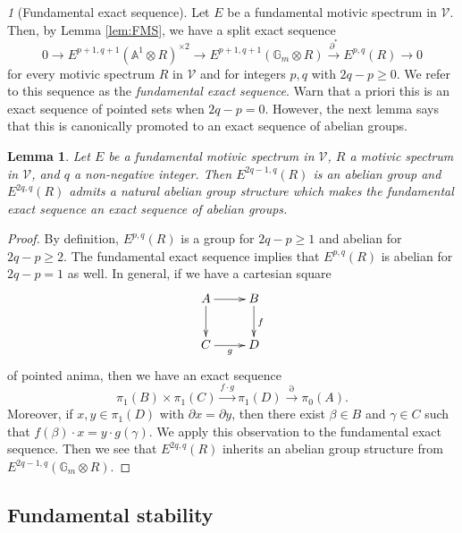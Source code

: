 \documentclass{amsart}
\theoremstyle{plain}
\newtheorem{lemma}[theorem]{Lemma}
\theoremstyle{definition}
\theoremstyle{remark}
\newtheorem{p}[theorem]{}
\numberwithin{equation}{theorem}
\newcommand{\mbb}[1]{\mathbb{#1}}
\newcommand{\V}{\mathcal{V}}
\begin{document}
\begin{p}[Fundamental exact sequence]
Let $E$ be a fundamental motivic spectrum in $\V$.
Then, by Lemma \ref{lem:FMS}, we have a split exact sequence
\[
	0 \to E^{p+1,q+1}(\mbb{A}^1\otimes R)^{\times 2} \to E^{p+1,q+1}(\mbb{G}_m\otimes R) \xrightarrow{\partial^*} E^{p,q}(R) \to 0 
\]
for every motivic spectrum $R$ in $\V$ and for integers $p,q$ with $2q-p\ge 0$.
We refer to this sequence as the \textit{fundamental exact sequence}.
Warn that a priori this is an exact sequence of pointed sets when $2q-p=0$.
However, the next lemma says that this is canonically promoted to an exact sequence of abelian groups.
\end{p}

\begin{lemma}\label{lem:FMS2}
Let $E$ be a fundamental motivic spectrum in $\V$, $R$ a motivic spectrum in $\V$, and $q$ a non-negative integer.
Then $E^{2q-1,q}(R)$ is an abelian group and $E^{2q,q}(R)$ admits a natural abelian group structure which makes the fundamental exact sequence an exact sequence of abelian groups.
\end{lemma}
\begin{proof}
By definition, $E^{p,q}(R)$ is a group for $2q-p\ge 1$ and abelian for $2q-p\ge 2$.
The fundamental exact sequence implies that $E^{p,q}(R)$ is abelian for $2q-p=1$ as well.
In general, if we have a cartesian square
\[
\xymatrix{
	A \ar[r] \ar[d] & B \ar[d]^f \\
	C \ar[r]_g & D
}
\]
of pointed anima, then we have an exact sequence
\[
	\pi_1(B)\times\pi_1(C) \xrightarrow{f\cdot g} \pi_1(D) \xrightarrow{\partial} \pi_0(A).
\]
Moreover, if $x,y\in\pi_1(D)$ with $\partial x=\partial y$, then there exist $\beta\in B$ and $\gamma\in C$ such that $f(\beta)\cdot x = y\cdot g(\gamma)$.
We apply this observation to the fundamental exact sequence.
Then we see that $E^{2q,q}(R)$ inherits an abelian group structure from $E^{2q-1,q}(\mbb{G}_m\otimes R)$.
\end{proof}


\subsection{Fundamental stability}\label{FSt}
\end{document}
